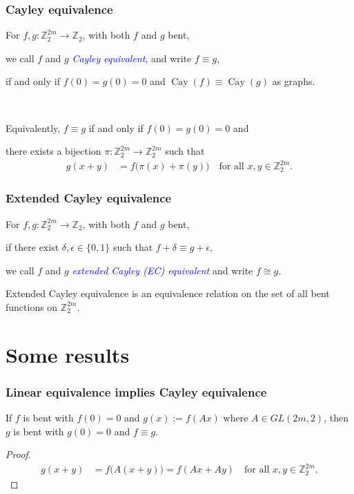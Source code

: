 \documentclass[pdf,sprung,slideColor,nocolorBG]{beamer}
\newcommand{\mb}[1]{\mathbb{#1}}
\newcommand{\Emph}[1]{\emph{\textcolor{blue}{#1}}}
\newcommand{\To}{\rightarrow}
\newcommand{\Cay}[1]{\operatorname{Cay}\left(#1\right)}
\newcommand{\Z}{\mb{Z}}
\begin{document}
\begin{frame}
\frametitle{Cayley equivalence}
\begin{Definition}
%
For $f, g : \Z_2^{2m} \To \Z_2$, with both $f$ and $g$ bent, 

we call $f$ and $g$ \Emph{Cayley equivalent},
and write $f \equiv g$, 

if and only if $f(0)=g(0)=0$ and $\Cay{f} \equiv \Cay{g}$ as graphs.

~

Equivalently, $f \equiv g$ if and only if $f(0)=g(0)=0$ and 

there exists a bijection $\pi : \Z_2^{2m} \To \Z_2^{2m}$ such that
\begin{align*}
g(x+y) &= f \big(\pi(x)+\pi(y)\big) \quad \text{for all~} x,y \in \Z_2^{2m}. 
\end{align*}
\end{Definition}
\end{frame}
\begin{frame}
\frametitle{Extended Cayley equivalence}
\begin{Definition}
For $f, g : \Z_2^{2m} \To \Z_2$, with both $f$ and $g$ bent,

if there exist $\delta, \epsilon \in \{0,1\}$ such that $f + \delta \equiv g + \epsilon$, 

we call $f$ and $g$ \Emph{extended Cayley (EC) equivalent} and write $f \cong g$. 
\end{Definition}
Extended Cayley equivalence is an equivalence relation on the set of all bent functions on $\Z_2^{2m}$.
\end{frame}
\section{Some results}

\begin{frame}
\frametitle{Linear equivalence implies Cayley equivalence}

\begin{Theorem}
If $f$ is bent with $f(0)=0$ and $g(x) := f(A x)$ where $A \in GL(2m,2)$,
then $g$ is bent with $g(0)=0$ and $f \equiv g$.
\end{Theorem}
\begin{proof}
\begin{align*}
g(x+y) &= f\big(A(x+y)\big) = f(A x + A y)\quad \text{for all~} x,y \in \Z_2^{2m}. 
\end{align*}
\end{proof}
 
\end{frame}
\end{document}
